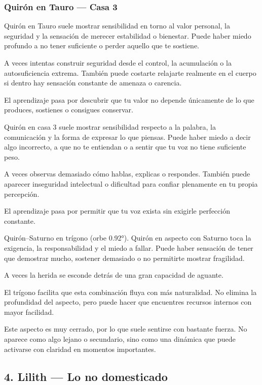 \documentclass[11pt,a4paper]{article}
\begin{document}
\subsubsection*{Quirón en Tauro — Casa 3}

Quirón en Tauro suele mostrar sensibilidad en torno al valor personal, la seguridad y la sensación de merecer estabilidad o bienestar. Puede haber miedo profundo a no tener suficiente o perder aquello que te sostiene.

A veces intentas construir seguridad desde el control, la acumulación o la autosuficiencia extrema. También puede costarte relajarte realmente en el cuerpo si dentro hay sensación constante de amenaza o carencia.

El aprendizaje pasa por descubrir que tu valor no depende únicamente de lo que produces, sostienes o consigues conservar.

Quirón en casa 3 suele mostrar sensibilidad respecto a la palabra, la comunicación y la forma de expresar lo que piensas. Puede haber miedo a decir algo incorrecto, a que no te entiendan o a sentir que tu voz no tiene suficiente peso.

A veces observas demasiado cómo hablas, explicas o respondes. También puede aparecer inseguridad intelectual o dificultad para confiar plenamente en tu propia percepción.

El aprendizaje pasa por permitir que tu voz exista sin exigirle perfección constante.

Quirón–Saturno en trígono (orbe 0.92°).
Quirón en aspecto con Saturno toca la exigencia, la responsabilidad y el miedo a fallar. Puede haber sensación de tener que demostrar mucho, sostener demasiado o no permitirte mostrar fragilidad.

A veces la herida se esconde detrás de una gran capacidad de aguante.

El trígono facilita que esta combinación fluya con más naturalidad. No elimina la profundidad del aspecto, pero puede hacer que encuentres recursos internos con mayor facilidad.

Este aspecto es muy cerrado, por lo que suele sentirse con bastante fuerza. No aparece como algo lejano o secundario, sino como una dinámica que puede activarse con claridad en momentos importantes.

\vspace{0.4cm}

\subsection{4. Lilith — Lo no domesticado}
\end{document}
